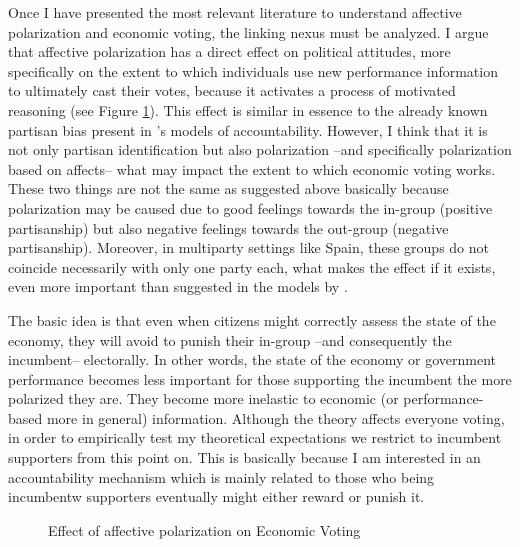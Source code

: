 \documentclass[a4paper, svgnames]{article}
\begin{document}
Once I have presented the most relevant literature to understand affective polarization and economic voting, the linking nexus must be analyzed. I argue that affective polarization has a direct effect on political attitudes, more specifically on the extent to which individuals use new performance information to ultimately cast their votes, because it activates a process of motivated reasoning (see Figure \ref{fig:model}). This effect is similar in essence to the already known partisan bias present in  \citet*{tilleyGovernmentBlameExperimental2011a}'s models of accountability. However, I think that it is not only partisan identification but also polarization --and specifically polarization based on affects-- what may impact the extent to which economic voting works. These two things are not the same as suggested above basically because polarization may be caused due to good feelings towards the in-group (positive partisanship) but also negative feelings towards the out-group (negative partisanship). Moreover, in multiparty settings like Spain, these groups do not coincide necessarily with only one party each, what makes the effect if it exists, even more important than suggested in the models by \citet*{tilleyGovernmentBlameExperimental2011a}.

The basic idea is that even when citizens might correctly assess the state of the economy, they will avoid to punish their in-group --and consequently the incumbent-- electorally. In other words, the state of the economy or government performance becomes less important for those supporting the incumbent the more polarized they are. They become more inelastic to economic (or performance-based more in general) information. Although the theory affects everyone voting, in order to empirically test my theoretical expectations we restrict to incumbent supporters from this point on. This is basically because I am interested in an accountability mechanism which is mainly related to those who being incumbentw supporters eventually might either reward or punish it.

\begin{figure}[H]
	\centering
	\caption{\label{fig:model} Effect of affective polarization on Economic Voting}
\end{figure}
\end{document}
